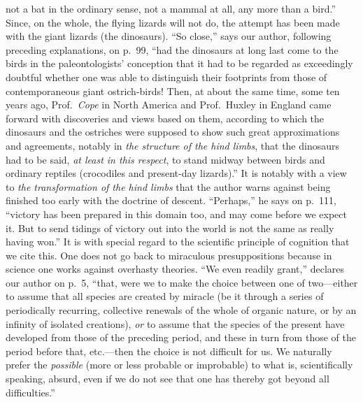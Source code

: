 \documentclass[12pt,a4paper]{article}
\newcommand{\opage}[1]{\marginnote{\footnotesize\textit{[#1]}}}
\begin{document}
not a bat in the ordinary sense, not a mammal at all, any more than a
bird.'' Since, on the whole, the flying lizards will not do, the
attempt has been made with the giant lizards (the dinosaurs). ``So
close,'' says our author, following preceding explanations, on p.\ 99,
``had the dinosaurs at long last come to the birds in the
paleontologists'
\opage{39}conception that it had to be regarded as exceedingly doubtful
whether one was able to distinguish their footprints from those of
contemporaneous giant ostrich-birds! Then, at about the same time,
some ten years ago, Prof.\ \emph{Cope} in North America and Prof.\
Huxley in England came forward with discoveries and views based on
them, according to which the dinosaurs and the ostriches were supposed
to show such great approximations and agreements, notably in \emph{the
structure of the hind limbs}, that the dinosaurs had to be said,
\emph{at least in this respect}, to stand midway between birds and
ordinary reptiles (crocodiles and present-day lizards).'' It is
notably with a view to \emph{the transformation of the hind limbs}
that the author warns against being finished too early with the
doctrine of descent. ``Perhaps,'' he says on p.\ 111, ``victory has
been prepared in this domain too, and may come before we expect it.
But to send tidings of victory out into the world is not the same as
really having won.'' It is with special regard to the scientific
principle of cognition that we cite this. One does not go back to
miraculous presuppositions because in science one works against
overhasty theories. ``We even readily grant,'' declares our author on
p.\ 5, ``that, were we to make the choice between one of two---either
to assume that all species are created by miracle (be it through a
series of periodically recurring, collective renewals of the whole of
organic nature, or by an infinity of isolated creations), \emph{or} to
assume that the species of the present have developed from those of
the preceding period, and these in turn from those of the period
before that, etc.---then the choice is not difficult for us. We
naturally prefer the \emph{possible} (more or less probable or
improbable) to what is, scientifically speaking, absurd, even if we do
not see that one has thereby got beyond all difficulties.''
\end{document}
